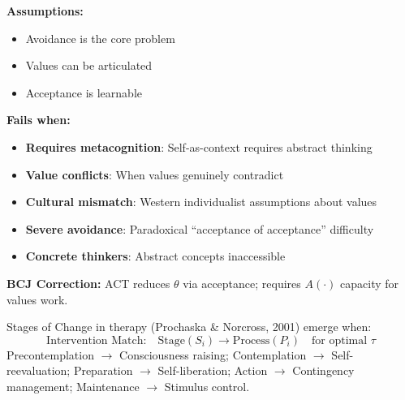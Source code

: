 \begin{tcolorbox}[colback=red!5!white, colframe=red!75!black, title=Boundary Condition: Where ACT Fails]
\textbf{Assumptions:}
\begin{itemize}[nosep]
\item Avoidance is the core problem
\item Values can be articulated
\item Acceptance is learnable
\end{itemize}

\textbf{Fails when:}
\begin{itemize}[nosep]
\item \textbf{Requires metacognition}: Self-as-context requires abstract thinking
\item \textbf{Value conflicts}: When values genuinely contradict
\item \textbf{Cultural mismatch}: Western individualist assumptions about values
\item \textbf{Severe avoidance}: Paradoxical ``acceptance of acceptance'' difficulty
\item \textbf{Concrete thinkers}: Abstract concepts inaccessible
\end{itemize}

\textbf{BCJ Correction:} ACT reduces $\theta$ via acceptance; requires $A(\cdot)$ capacity for values work.
\end{tcolorbox}


\begin{theorem}
\label{thm:therapeutic-stages}
Stages of Change in therapy (Prochaska \& Norcross, 2001) emerge when:
\begin{equation}
\boxed{\text{Intervention Match:} \quad \text{Stage}(S_i) \to \text{Process}(P_i) \quad \text{for optimal } \tau}
\end{equation}
Precontemplation $\to$ Consciousness raising; Contemplation $\to$ Self-reevaluation; Preparation $\to$ Self-liberation; Action $\to$ Contingency management; Maintenance $\to$ Stimulus control.
\end{theorem}

